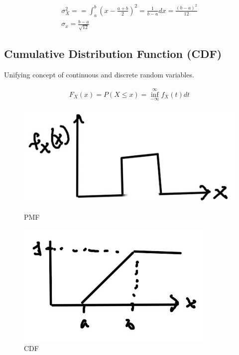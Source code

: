 \begin{align*}
\sigma_X^2= = \int_a^b (x - \frac{a+b}{2})^2 = \frac{1}{b-a}dx = \frac{(b-a)^2}{12}\\
\sigma_x = \frac{b-a}{\sqrt{12}}
\end{align*}

\subsection{Cumulative Distribution Function (CDF)}


Unifying concept of continuous and discrete random variables.

\begin{align*}
F_X(x) = P(X \le x) = \inf_{-\infty}^{\infty} f_X(t)dt
\end{align*}

\begin{figure}[ht]
\centering
\begin{minipage}{.45\linewidth}
  \includegraphics[width=\linewidth]{images/L08/continuous_unif_pdf.jpeg}
  \caption{PMF}
  \label{continuous_unif_pdf}
\end{minipage}
\hspace{.05\linewidth}
\begin{minipage}{.45\linewidth}
  \includegraphics[width=\linewidth]{images/L08/continuous_cdf.jpeg}
  \caption{CDF}
  \label{continuous_cdf}
\end{minipage}
\end{figure}

